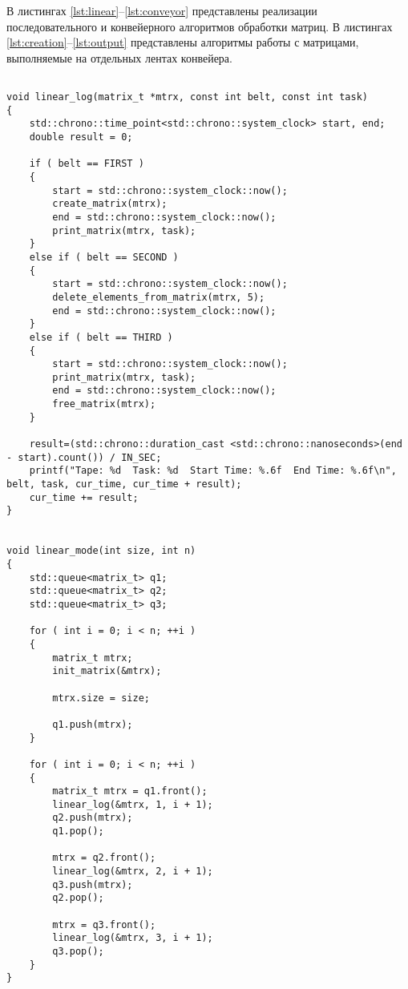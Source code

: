 В листингах \ref{lst:linear}--\ref{lst:conveyor} представлены реализации последовательного и конвейерного алгоритмов обработки матриц. В листингах \ref{lst:creation}--\ref{lst:output} представлены алгоритмы работы с матрицами, выполняемые на отдельных лентах конвейера.
\clearpage
\begin{center}
	\captionsetup{justification=raggedright,singlelinecheck=off}
	\begin{lstlisting}[label=lst:linear,caption=Реализация последовательного алгоритма обработки матриц]
		
void linear_log(matrix_t *mtrx, const int belt, const int task)
{
	std::chrono::time_point<std::chrono::system_clock> start, end;
	double result = 0;
	
	if ( belt == FIRST )
	{
		start = std::chrono::system_clock::now();
		create_matrix(mtrx);
		end = std::chrono::system_clock::now();
		print_matrix(mtrx, task);
	}
	else if ( belt == SECOND )
	{
		start = std::chrono::system_clock::now();
		delete_elements_from_matrix(mtrx, 5);
		end = std::chrono::system_clock::now();
	}
	else if ( belt == THIRD )
	{
		start = std::chrono::system_clock::now();
		print_matrix(mtrx, task);
		end = std::chrono::system_clock::now();
		free_matrix(mtrx);
	}
	
	result=(std::chrono::duration_cast <std::chrono::nanoseconds>(end - start).count()) / IN_SEC;
	printf("Tape: %d  Task: %d  Start Time: %.6f  End Time: %.6f\n", belt, task, cur_time, cur_time + result);
	cur_time += result;
}


void linear_mode(int size, int n)
{
	std::queue<matrix_t> q1;
	std::queue<matrix_t> q2;
	std::queue<matrix_t> q3;
	
	for ( int i = 0; i < n; ++i )
	{
		matrix_t mtrx;
		init_matrix(&mtrx);
		
		mtrx.size = size;
		
		q1.push(mtrx);
	}
	
	for ( int i = 0; i < n; ++i )
	{
		matrix_t mtrx = q1.front();
		linear_log(&mtrx, 1, i + 1);
		q2.push(mtrx);
		q1.pop();
		
		mtrx = q2.front();
		linear_log(&mtrx, 2, i + 1);
		q3.push(mtrx);
		q2.pop();
		
		mtrx = q3.front();
		linear_log(&mtrx, 3, i + 1);
		q3.pop();
	}
}
	\end{lstlisting} 
\end{center}


